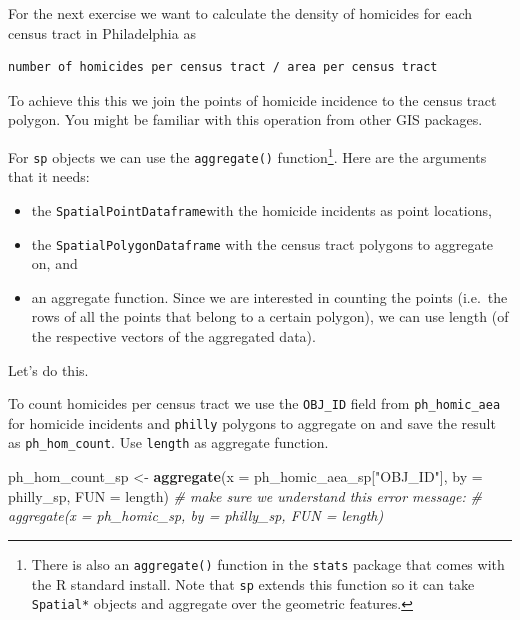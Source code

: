 \documentclass[]{book}
\newenvironment{Shaded}{\begin{snugshade}}{\end{snugshade}}
\newcommand{\KeywordTok}[1]{\textcolor[rgb]{0.13,0.29,0.53}{\textbf{#1}}}
\newcommand{\DataTypeTok}[1]{\textcolor[rgb]{0.13,0.29,0.53}{#1}}
\newcommand{\StringTok}[1]{\textcolor[rgb]{0.31,0.60,0.02}{#1}}
\newcommand{\CommentTok}[1]{\textcolor[rgb]{0.56,0.35,0.01}{\textit{#1}}}
\newcommand{\NormalTok}[1]{#1}
\providecommand{\tightlist}{%
  \setlength{\itemsep}{0pt}\setlength{\parskip}{0pt}}
\let\rmarkdownfootnote\footnote%
\def\footnote{\protect\rmarkdownfootnote}
\theoremstyle{definition}
\theoremstyle{definition}
\theoremstyle{definition}
\theoremstyle{remark}
\begin{document}
For the next exercise we want to calculate the density of homicides for
each census tract in Philadelphia as

\begin{verbatim}
number of homicides per census tract / area per census tract
\end{verbatim}

To achieve this this we join the points of homicide incidence to the
census tract polygon. You might be familiar with this operation from
other GIS packages.

For \texttt{sp} objects we can use the \texttt{aggregate()}
function\footnote{There is also an \texttt{aggregate()} function in the
  \texttt{stats} package that comes with the R standard install. Note
  that \texttt{sp} extends this function so it can take
  \texttt{Spatial*} objects and aggregate over the geometric features.}.
Here are the arguments that it needs:

\begin{itemize}
\tightlist
\item
  the \texttt{SpatialPointDataframe}with the homicide incidents as point
  locations,
\item
  the \texttt{SpatialPolygonDataframe} with the census tract polygons to
  aggregate on, and
\item
  an aggregate function. Since we are interested in counting the points
  (i.e.~the rows of all the points that belong to a certain polygon), we
  can use length (of the respective vectors of the aggregated data).
\end{itemize}

Let's do this.

To count homicides per census tract we use the \texttt{OBJ\_ID} field
from \texttt{ph\_homic\_aea} for homicide incidents and \texttt{philly}
polygons to aggregate on and save the result as \texttt{ph\_hom\_count}.
Use \texttt{length} as aggregate function.

\begin{Shaded}
\begin{Highlighting}[]
\NormalTok{ph_hom_count_sp <-}\StringTok{ }\KeywordTok{aggregate}\NormalTok{(}\DataTypeTok{x =}\NormalTok{ ph_homic_aea_sp[}\StringTok{"OBJ_ID"}\NormalTok{], }\DataTypeTok{by =}\NormalTok{ philly_sp, }\DataTypeTok{FUN =}\NormalTok{ length)}
\CommentTok{# make sure we understand this error message:}
\CommentTok{# aggregate(x = ph_homic_sp, by = philly_sp, FUN = length) }
\end{Highlighting}
\end{Shaded}
\end{document}
